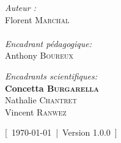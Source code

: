 \documentclass[../main]{subfiles} %
\begin{document}
\begin{titlepage}
\begin{center}
\noindent
\begin{minipage}{0.4\textwidth}
  \begin{flushleft} \large
    \emph{Auteur :}\\
    Florent \textsc{Marchal} \\
     \\
    \emph{Encadrant pédagogique:} \\
    Anthony \textsc{Boureux}\\
    
  \end{flushleft}
\end{minipage}
\begin{minipage}{0.5\textwidth}
  \begin{flushright} \large
    

    \emph{Encadrants scientifiques:} \\
    \textbf{Concetta \textsc{Burgarella}} \\
    Nathalie \textsc{Chantret} \\
    Vincent \textsc{Ranwez}
      \\
    

  \end{flushright}
\end{minipage}

\vfill

{\large [ \today  | Version 1.0.0 ]}

\end{center}
\end{titlepage}


\end{document}
